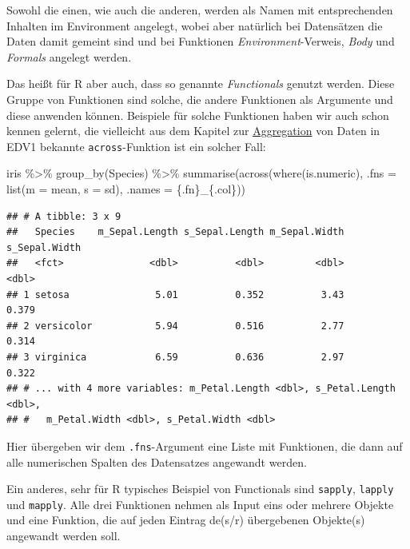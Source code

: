 \documentclass[
]{book}
\newenvironment{Shaded}{\begin{snugshade}}{\end{snugshade}}
\newcommand{\AttributeTok}[1]{\textcolor[rgb]{0.77,0.63,0.00}{#1}}
\newcommand{\FunctionTok}[1]{\textcolor[rgb]{0.00,0.00,0.00}{#1}}
\newcommand{\NormalTok}[1]{#1}
\newcommand{\SpecialCharTok}[1]{\textcolor[rgb]{0.00,0.00,0.00}{#1}}
\newcommand{\StringTok}[1]{\textcolor[rgb]{0.31,0.60,0.02}{#1}}
\begin{document}
Sowohl die einen, wie auch die anderen, werden als Namen mit entsprechenden Inhalten im Environment angelegt, wobei aber natürlich bei Datensätzen die Daten damit gemeint sind und bei Funktionen \emph{Environment}-Verweis, \emph{Body} und \emph{Formals} angelegt werden.

Das heißt für R aber auch, dass so genannte \emph{Functionals} genutzt werden. Diese Gruppe von Funktionen sind solche, die andere Funktionen als Argumente und diese anwenden können. Beispiele für solche Funktionen haben wir auch schon kennen gelernt, die vielleicht aus dem Kapitel zur \href{https://mbrede.github.io/CAU_Kiel_EDVI/aggregation-und-filemanagement.html}{Aggregation} von Daten in EDV1 bekannte \texttt{across}-Funktion ist ein solcher Fall:

\begin{Shaded}
\begin{Highlighting}[]
\NormalTok{iris }\SpecialCharTok{\%\textgreater{}\%} 
  \FunctionTok{group\_by}\NormalTok{(Species) }\SpecialCharTok{\%\textgreater{}\%} 
  \FunctionTok{summarise}\NormalTok{(}\FunctionTok{across}\NormalTok{(}\FunctionTok{where}\NormalTok{(is.numeric),}
                   \AttributeTok{.fns =} \FunctionTok{list}\NormalTok{(}\AttributeTok{m =}\NormalTok{ mean, }\AttributeTok{s =}\NormalTok{ sd),}
                   \AttributeTok{.names =} \StringTok{\textquotesingle{}\{.fn\}\_\{.col\}\textquotesingle{}}\NormalTok{))}
\end{Highlighting}
\end{Shaded}

\begin{verbatim}
## # A tibble: 3 x 9
##   Species    m_Sepal.Length s_Sepal.Length m_Sepal.Width s_Sepal.Width
##   <fct>               <dbl>          <dbl>         <dbl>         <dbl>
## 1 setosa               5.01          0.352          3.43         0.379
## 2 versicolor           5.94          0.516          2.77         0.314
## 3 virginica            6.59          0.636          2.97         0.322
## # ... with 4 more variables: m_Petal.Length <dbl>, s_Petal.Length <dbl>,
## #   m_Petal.Width <dbl>, s_Petal.Width <dbl>
\end{verbatim}

Hier übergeben wir dem \texttt{.fns}-Argument eine Liste mit Funktionen, die dann auf alle numerischen Spalten des Datensatzes angewandt werden.

Ein anderes, sehr für R typisches Beispiel von Functionals sind \texttt{sapply}, \texttt{lapply} und \texttt{mapply}. Alle drei Funktionen nehmen als Input eins oder mehrere Objekte und eine Funktion, die auf jeden Eintrag de(s/r) übergebenen Objekte(s) angewandt werden soll.
\end{document}
